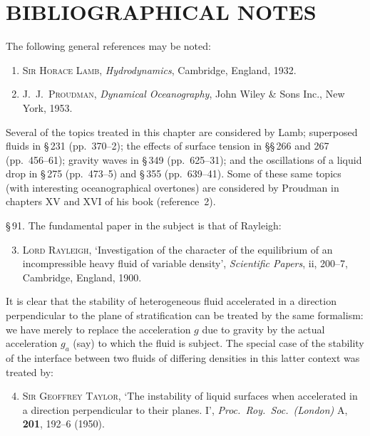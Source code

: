 \section*{BIBLIOGRAPHICAL NOTES}

The following general references may be noted:
\begin{enumerate}
\item \textsc{Sir Horace Lamb}, \textit{Hydrodynamics}, Cambridge, England, 1932.
\item \textsc{J.\ J.\ Proudman}, \textit{Dynamical Oceanography}, John Wiley \& Sons Inc., New York, 1953.
\end{enumerate}

Several of the topics treated in this chapter are considered by Lamb; superposed fluids in \S\,231 (pp.~370--2); the effects of surface tension in \S\S\,266 and 267 (pp.~456--61); gravity waves in \S\,349 (pp.~625--31); and the oscillations of a liquid drop in \S\,275 (pp.~473--5) and \S\,355 (pp.~639--41). Some of these same topics (with interesting oceanographical overtones) are considered by Proudman in chapters XV and XVI of his book (reference~2).

\medskip
\noindent\S\,91. The fundamental paper in the subject is that of Rayleigh:

\begin{enumerate}
\setcounter{enumi}{2}
\item \textsc{Lord Rayleigh}, `Investigation of the character of the equilibrium of an incompressible heavy fluid of variable density', \textit{Scientific Papers}, ii, 200--7, Cambridge, England, 1900.
\end{enumerate}

It is clear that the stability of heterogeneous fluid accelerated in a direction perpendicular to the plane of stratification can be treated by the same formalism: we have merely to replace the acceleration $g$ due to gravity by the actual acceleration $g_a$ (say) to which the fluid is subject. The special case of the stability of the interface between two fluids of differing densities in this latter context was treated by:

\begin{enumerate}
\setcounter{enumi}{3}
\item \textsc{Sir Geoffrey Taylor}, `The instability of liquid surfaces when accelerated in a direction perpendicular to their planes. I', \textit{Proc.\ Roy.\ Soc.\ (London)} A, \textbf{201}, 192--6 (1950).
\end{enumerate}

